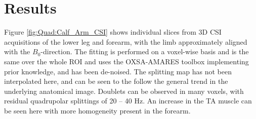 
\section{Results}

Figure \ref{fig:Quad:Calf_Arm_CSI} shows individual slices from 3D \ac{CSI} acquisitions of the lower leg and forearm, with the limb approximately aligned with the $B_0$-direction. The fitting is performed on a voxel-wise basis and is the same over the whole \ac{ROI} and uses the OXSA-AMARES toolbox \cite{Purvis2017OXSA:MATLAB} implementing prior knowledge, and has been de-noised. The splitting map has not been interpolated here, and can be seen to the follow the general trend in the underlying anatomical image. Doublets can be observed in many voxels, with residual quadrupolar splittings of 20 – 40 Hz. An increase in the \ac{TA} muscle can be seen here with more homogeneity present in the forearm.

